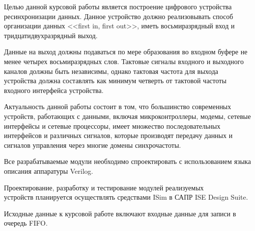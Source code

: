 \Introduction



Целью данной курсовой работы является построение цифрового устройства ресинхронизации данных. Данное устройство должно реализовывать способ организации данных <<first in, first out>>, иметь восьмиразрядный вход и тридцатидвухразрядный выход.

Данные на выход должны подаваться по мере образования во входном буфере не менее четырех восьмиразрядных слов. Тактовые сигналы входного и выходного каналов должны быть независимы, однако тактовая частота для выхода устройства должна составлять как минимум  четверть от тактовой частоты входного интерфейса устройства.

Актуальность данной работы состоит в том, что большинство современных устройств, работающих с данными, включая микроконтроллеры, модемы, сетевые интерфейсы и сетевые процессоры, имеет множество последовательных интерфейсов и различных сигналов, которые производят передачу данных и сигналов управления через многие домены синхрочастоты.

Все разрабатываемые модули необходимо спроектировать с использованием языка описания аппаратуры Verilog.

Проектирование, разработку и тестирование модулей реализуемых \\устройств планируется осуществлять средствами ISim в САПР ISE Design Suite.

Исходные данные к курсовой работе включают входные данные для записи в очередь FIFO.


%
